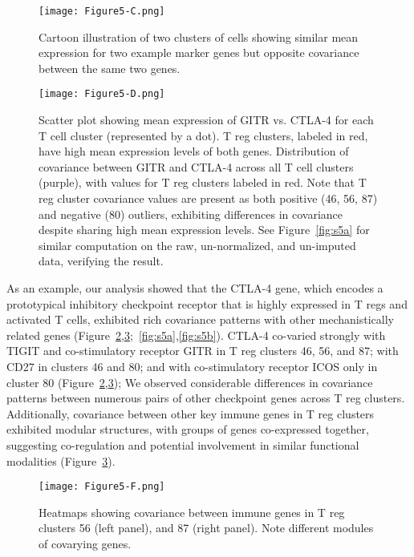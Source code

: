 \begin{figure}
\centering
\texttt{[image: Figure5-C.png]}
\caption{Cartoon illustration of two clusters of cells showing similar mean expression for two example marker genes but opposite covariance between the same two genes.
}
\label{fig:5c}
\end{figure}

\begin{figure}
\centering
\texttt{[image: Figure5-D.png]}
\caption{Scatter plot showing mean expression of GITR vs. CTLA-4 for each T cell cluster (represented by a dot).
  T reg clusters, labeled in red, have high mean expression levels of both genes.
Distribution of covariance between GITR and CTLA-4 across all T cell clusters (purple), with values for T reg clusters labeled in red.
Note that T reg cluster covariance values are present as both positive (46, 56, 87) and negative (80) outliers, exhibiting differences in covariance despite sharing high mean expression levels.
See Figure~\ref{fig:s5a} for similar computation on the raw, un-normalized, and un-imputed data, verifying the result.
}
\label{fig:5d}
\end{figure}

As an example, our analysis showed that the CTLA-4 gene, which encodes a prototypical inhibitory checkpoint receptor that is highly expressed in T regs and activated T cells, exhibited rich covariance patterns with other mechanistically related genes (Figure~\ref{fig:5d},\ref{fig:5f};~\ref{fig:s5a},\ref{fig:s5b}).
CTLA-4 co-varied strongly with TIGIT and co-stimulatory receptor GITR in T reg clusters 46, 56, and 87; with CD27 in clusters 46 and 80; and with co-stimulatory receptor ICOS only in cluster 80 (Figure~\ref{fig:5d},\ref{fig:5f}); We observed considerable differences in covariance patterns between numerous pairs of other checkpoint genes across T reg clusters.
Additionally, covariance between other key immune genes in T reg clusters exhibited modular structures, with groups of genes co-expressed together, suggesting co-regulation and potential involvement in similar functional modalities (Figure~\ref{fig:5f}).

\begin{figure}
\centering
\texttt{[image: Figure5-F.png]}
\caption{Heatmaps showing covariance between immune genes in T reg clusters 56 (left panel), and 87 (right panel). Note different modules of covarying genes.
}
\label{fig:5f}
\end{figure}

